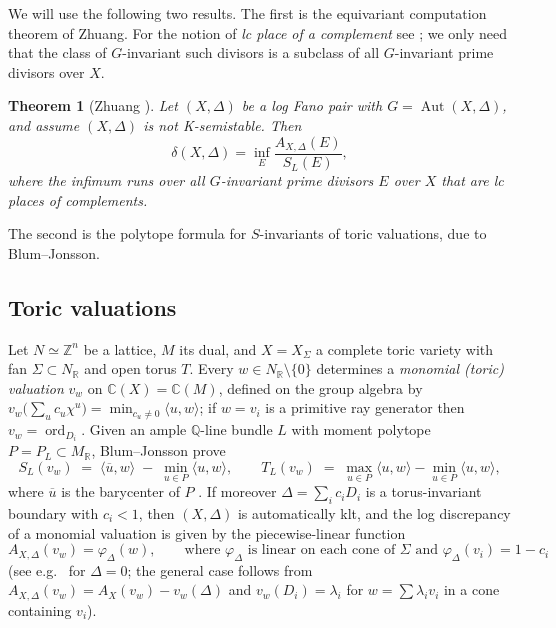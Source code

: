 \documentclass[11pt]{amsart}
\newtheorem{theorem}{Theorem}[section]
\theoremstyle{definition}
\theoremstyle{remark}
\DeclareMathOperator{\ord}{ord}
\DeclareMathOperator{\Aut}{Aut}
\newcommand{\NR}{N_{\mathbb{R}}}
\newcommand{\MReal}{M_{\mathbb{R}}}
\newcommand{\Q}{\mathbb{Q}}
\newcommand{\Z}{\mathbb{Z}}
\newcommand{\C}{\mathbb{C}}
\newcommand{\bary}{\overline{u}}
\begin{document}
We will use the following two results. The first is the equivariant
computation theorem of Zhuang. For the notion of \emph{lc place of a
complement} see \cite[\S2]{Zhu21}; we only need that the class of
\(G\)-invariant such divisors is a subclass of all \(G\)-invariant prime
divisors over \(X\).

\begin{theorem}[{Zhuang \cite[Theorem 1.2]{Zhu21}}]\label{thm:zhuang}
Let \((X,\Delta)\) be a log Fano pair with \(G=\Aut(X,\Delta)\), and
assume \((X,\Delta)\) is \emph{not} K-semistable. Then
\[
\delta(X,\Delta) = \inf_E \frac{A_{X,\Delta}(E)}{S_L(E)},
\]
where the infimum runs over all \(G\)-invariant prime divisors \(E\) over
\(X\) that are lc places of complements.
\end{theorem}

The second is the polytope formula for \(S\)-invariants of toric
valuations, due to Blum--Jonsson.

\subsection{Toric valuations}\label{ss:toric}
Let \(N\simeq\Z^n\) be a lattice, \(M\) its dual, and \(X=X_\Sigma\) a
complete toric variety with fan \(\Sigma\subset\NR\) and open torus
\(T\). Every \(w\in \NR\setminus\{0\}\) determines a \emph{monomial (toric)
valuation} \(v_w\) on \(\C(X)=\C(M)\), defined on the group algebra by
\(v_w\bigl(\sum_u c_u\chi^u\bigr)=\min_{c_u\neq0}\langle u,w\rangle\); if
\(w=v_i\) is a primitive ray generator then \(v_w=\ord_{D_i}\). Given an
ample \(\Q\)-line bundle \(L\) with moment polytope
\(P=P_L\subset\MReal\), Blum--Jonsson prove
\begin{equation}\label{eq:BJS}
S_L(v_w) \;=\; \langle \bary, w\rangle \;-\;\min_{u\in P}\langle u,
w\rangle,
\qquad
T_L(v_w) \;=\; \max_{u\in P}\langle u,w\rangle-\min_{u\in P}\langle
u,w\rangle,
\end{equation}
where \(\bary\) is the barycenter of \(P\)
\cite[Corollary 7.7]{BJ20}. If moreover \(\Delta=\sum_i c_iD_i\) is a
torus-invariant boundary with \(c_i<1\), then \((X,\Delta)\) is
automatically klt, and the log discrepancy of a monomial valuation is
given by the piecewise-linear function
\begin{equation}\label{eq:Atoric}
A_{X,\Delta}(v_w) = \varphi_\Delta(w), \qquad \text{where }
\varphi_\Delta \text{ is linear on each cone of } \Sigma \text{ and }
\varphi_\Delta(v_i)=1-c_i
\end{equation}
(see e.g.\ \cite[\S7]{BJ20} for \(\Delta=0\); the general case follows
from \(A_{X,\Delta}(v_w)=A_X(v_w)-v_w(\Delta)\) and
\(v_w(D_i)=\lambda_i\) for \(w=\sum\lambda_i v_i\) in a cone containing
\(v_i\)).
\end{document}
